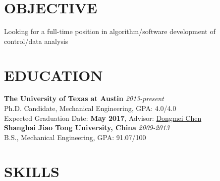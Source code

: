 \documentclass[margin, 9pt]{res} %
\begin{document}
\begin{resume}


\vspace*{-5pt}


\section{OBJECTIVE}
Looking for a full-time position in algorithm/software development of control/data analysis


\vspace*{-10pt}
\section{EDUCATION}

\textbf{The University of Texas at Austin} \hfill\textit{2013-present}\\
Ph.D. Candidate, Mechanical Engineering, GPA: 4.0/4.0\\
Expected Graduation Date: \textbf{May 2017},  Advisor: \href{http://www.me.utexas.edu/~apscl/people.html}{Dongmei Chen}\\

\vspace*{-10pt}
\textbf{Shanghai Jiao Tong University, China} \hfill\textit{2009-2013}\\
B.S., Mechanical Engineering, GPA: 91.07/100\\

\vspace*{-10pt}
\section{SKILLS}


\end{resume}
\end{document}
